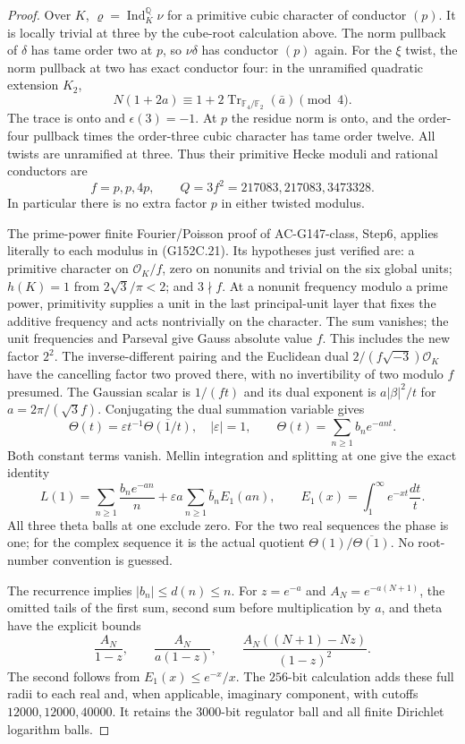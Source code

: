\begin{proof}
Over $K$, $\varrho=\operatorname{Ind}_K^{\mathbb Q}\nu$
for a primitive cubic character of conductor $(p)$.
It is locally trivial at three by the cube-root calculation above.
The norm pullback of $\delta$ has tame order two at $p$,
so $\nu\delta$ has conductor $(p)$ again.
For the $\xi$ twist, the norm pullback at two has exact
conductor four: in the unramified quadratic extension $K_2$,
\[
 N(1+2a)\equiv1+2\operatorname{Tr}_{\mathbb F_4/\mathbb F_2}
                                    (\bar a)\pmod4.
 \tag{G152C.20}
\]
The trace is onto and $\epsilon(3)=-1$.
At $p$ the residue norm is onto, and the order-four pullback
times the order-three cubic character has tame order twelve.
All twists are unramified at three.
Thus their primitive Hecke moduli and rational conductors are
\[
 f=p,p,4p,\qquad Q=3f^2=217083,217083,3473328.
 \tag{G152C.21}
\]
In particular there is no extra factor $p$ in either twisted modulus.

The prime-power finite Fourier/Poisson proof of AC-G147-class,
Step6, applies literally to each modulus in (G152C.21).
Its hypotheses just verified are: a primitive character on
$\mathcal O_K/f$, zero on nonunits and trivial on the six
global units; $h(K)=1$ from $2\sqrt3/\pi<2$; and $3\nmid f$.
At a nonunit frequency modulo a prime power, primitivity
supplies a unit in the last principal-unit layer that fixes
the additive frequency and acts nontrivially on the character.
The sum vanishes; the unit frequencies and Parseval give Gauss
absolute value $f$.  This includes the new factor $2^2$.
The inverse-different pairing and the Euclidean dual
$2/(f\sqrt{-3})\mathcal O_K$ have the cancelling factor two
proved there, with no invertibility of two modulo $f$ presumed.
The Gaussian scalar is $1/(ft)$ and its dual exponent is
$a|\beta|^2/t$ for $a=2\pi/(\sqrt3f)$.
Conjugating the dual summation variable gives
\[
 \Theta(t)=\varepsilon t^{-1}\overline{\Theta(1/t)},
 \quad |\varepsilon|=1,\qquad
 \Theta(t)=\sum_{n\ge1}b_ne^{-ant}.
 \tag{G152C.22}
\]
Both constant terms vanish.  Mellin integration and splitting
at one give the exact identity
\[
 L(1)=\sum_{n\ge1}\frac{b_ne^{-an}}n
       +\varepsilon a\sum_{n\ge1}\bar b_n E_1(an),
 \qquad E_1(x)=\int_1^\infty e^{-xt}\frac{dt}{t}.
 \tag{G152C.23}
\]
All three theta balls at one exclude zero.
For the two real sequences the phase is one; for the complex
sequence it is the actual quotient
$\Theta(1)/\overline{\Theta(1)}$.
No root-number convention is guessed.

The recurrence implies $|b_n|\le d(n)\le n$.
For $z=e^{-a}$ and $A_N=e^{-a(N+1)}$, the omitted tails of
the first sum, second sum before multiplication by $a$, and theta
have the explicit bounds
\[
 \frac{A_N}{1-z},\qquad \frac{A_N}{a(1-z)},\qquad
                   \frac{A_N((N+1)-Nz)}{(1-z)^2}.
 \tag{G152C.24}
\]
The second follows from $E_1(x)\le e^{-x}/x$.
The $256$-bit calculation adds these full radii to each real
and, when applicable, imaginary component, with cutoffs
$12000,12000,40000$.
It retains the $3000$-bit regulator ball and all finite
Dirichlet logarithm balls.


\end{proof}
